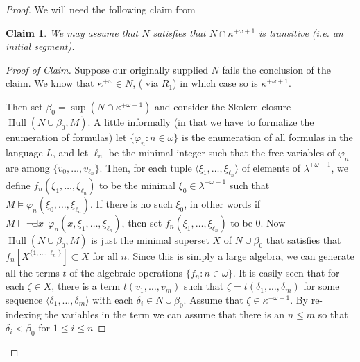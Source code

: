 \documentclass{amsart}
\theoremstyle{plain}
\theoremstyle{definition}
\theoremstyle{remark}
\theoremstyle{plain}
\newtheorem*{claim*}{Claim}
\theoremstyle{definition}
\theoremstyle{remark}
\begin{document}
\begin{proof}
          We will need the following claim from \cite{MR1045371}

          \begin{claim*} We may assume that $N$ satisfies that
           $N\cap \kappa^{+\omega+1}$ is transitive (i.e. an initial segment).
          \end{claim*}

          \begin{proof}[Proof of Claim]
          Suppose  our originally supplied $N$ fails the conclusion of the
          claim.
          We   know that $\kappa^{+\omega}\in N$,
          (  via $R_1$)
          in which case so is $\kappa^{+\omega+1}$.


          Then set $\beta_0 = \sup(N\cap \kappa^{+\omega+1})$ and consider the
          Skolem closure $\mathop{Hull}(N\cup \beta_0, M)$.  A little informally
          (in that we have to formalize the enumeration of formulas)
          let $\{\varphi_n : n\in \omega\}$ is the enumeration of all formulas
          in the language $L$, and let  $\ell_n$ be the minimal integer such
          that the free variables of $\varphi_n$ are among
           $\{ v_0, \ldots, v_{\ell_n}\}$.
          Then,   for each tuple
          $\langle \xi_1,\ldots, \xi_{\ell_n} \rangle$
          of elements of $\lambda^{+\omega+1}$,
           we define $f_n(\xi_1,\ldots, \xi_{\ell_n})$ to be
           the minimal $\xi_0\in \lambda^{+\omega+1}$ such that
           $M\models \varphi_n(\xi_0,\ldots, \xi_{\ell_n})$.
          If there is no such $\xi_0$,
             in other words if $M\models \lnot\exists x~~  \varphi_n(x,\xi_1,
          \ldots,\xi_{\ell_n})$, then set
           $f_n(\xi_1,\ldots, \xi_{\ell_n})$ to be $0$.
          Now $\mathop{Hull}(N\cup \beta_0,M)$ is just the minimal superset
           $X$
          of $N\cup \beta_0$ that satisfies that
           $f_n[X^{\{1,\ldots,\ell_n\}}] \subset X$ for all $n$. Since this is
           simply a large algebra, we can generate all the terms $t$ of
          the algebraic operations $\{ f_n : n\in \omega\}$.
          It is easily seen that for each $\zeta \in X$, there is a term
          $t(v_1,\ldots, v_m)$ such that $\zeta  = t(\delta_1,\ldots, \delta_m)$
           for some sequence $\langle \delta_1,\ldots, \delta_m\rangle$ with
           each $\delta_i\in  N\cup \beta_0$.
           Assume that
            $\zeta\in \kappa^{+\omega+1}$. By
            re-indexing the variables in the term we can assume
            that there is an $n\leq m$ so that
             $\delta_i  <\beta_0$ for $1\leq i\leq n$

\end{proof}
\end{proof}
\end{document}
